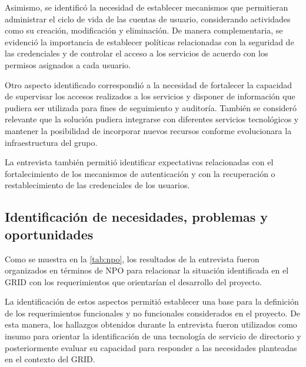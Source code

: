 Asimismo, se identificó la necesidad de establecer mecanismos que permitieran administrar el ciclo de vida de las cuentas de usuario, considerando actividades como su creación, modificación y eliminación. De manera complementaria, se evidenció la importancia de establecer políticas relacionadas con la seguridad de las credenciales y de controlar el acceso a los servicios de acuerdo con los permisos asignados a cada usuario.

Otro aspecto identificado correspondió a la necesidad de fortalecer la capacidad de supervisar los accesos realizados a los servicios y disponer de información que pudiera ser utilizada para fines de seguimiento y auditoría. También se consideró relevante que la solución pudiera integrarse con diferentes servicios tecnológicos y mantener la posibilidad de incorporar nuevos recursos conforme evolucionara la infraestructura del grupo.

La entrevista también permitió identificar expectativas relacionadas con el fortalecimiento de los mecanismos de autenticación y con la recuperación o restablecimiento de las credenciales de los usuarios.

\subsection{Identificación de necesidades, problemas y oportunidades}\label{subsec:identificacion-necesidades}

Como se muestra en la \autoref{tab:npo}, los resultados de la entrevista fueron organizados en términos de \ac{NPO} para relacionar la situación identificada en el \ac{GRID} con los requerimientos que orientarían el desarrollo del proyecto.



La identificación de estos aspectos permitió establecer una base para la definición de los requerimientos funcionales y no funcionales considerados en el proyecto. De esta manera, los hallazgos obtenidos durante la entrevista fueron utilizados como insumo para orientar la identificación de una tecnología de servicio de directorio y posteriormente evaluar su capacidad para responder a las necesidades planteadas en el contexto del \ac{GRID}.

